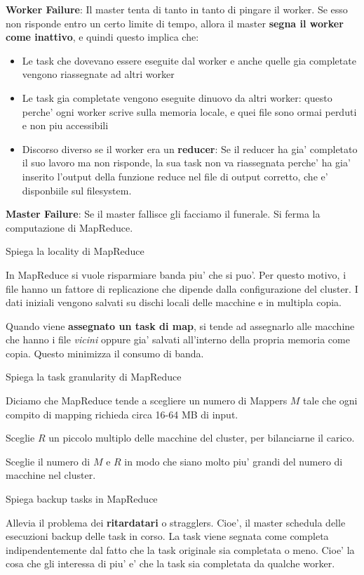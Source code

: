 \textbf{Worker Failure}: Il master tenta di tanto in tanto di pingare il worker. Se esso non risponde entro un certo limite di tempo, allora il master \textbf{segna il worker come inattivo}, e quindi questo implica che:
\begin{itemize}
    \item Le task che dovevano essere eseguite dal worker e anche quelle gia completate vengono riassegnate ad altri worker
    \item Le task gia completate vengono eseguite dinuovo da altri worker: questo perche' ogni worker scrive sulla memoria locale, e quei file sono ormai perduti e non piu accessibili
    \item Discorso diverso se il worker era un \textbf{reducer}: Se il reducer ha gia' completato il suo lavoro ma non risponde, la sua task non va riassegnata perche' ha gia' inserito l'output della funzione reduce nel file di output corretto, che e' disponbiile sul filesystem.
\end{itemize}

\textbf{Master Failure}: Se il master fallisce gli facciamo il funerale. Si ferma la computazione di MapReduce.

\begin{domanda}
    Spiega la locality di MapReduce
\end{domanda}

In MapReduce si vuole risparmiare banda piu' che si puo'. 
Per questo motivo, i file hanno un fattore di replicazione che dipende dalla configurazione del cluster.
I dati iniziali vengono salvati su dischi locali delle macchine e in multipla copia.

Quando viene \textbf{assegnato un task di map}, si tende ad assegnarlo alle macchine che hanno i file \textit{vicini} oppure gia' salvati all'interno della propria memoria come copia. Questo minimizza il consumo di banda.

\begin{domanda}
    Spiega la task granularity di MapReduce
\end{domanda}

Diciamo che MapReduce tende a scegliere un numero di Mappers $M$ 
tale che ogni compito di mapping richieda circa 16-64 MB di input.

Sceglie $R$ un piccolo multiplo delle macchine del cluster, per bilanciarne il carico. 

Sceglie il numero di $M$ e $R$ in modo che siano molto piu' grandi del numero di macchine nel cluster.

\begin{domanda}
    Spiega backup tasks in MapReduce
\end{domanda}

Allevia il problema dei \textbf{ritardatari} o stragglers. 
Cioe', il master schedula delle esecuzioni backup delle task in corso. La task viene segnata come completa 
indipendentemente dal fatto che la task originale sia completata o meno. Cioe' la cosa che
gli interessa di piu' e' che la task sia completata da qualche worker. 

\newpage